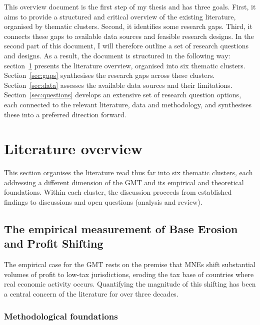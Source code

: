 \documentclass[11pt,a4paper]{article}
\begin{document}
This overview document is the first step of my thesis and has three goals. First, it aims to provide a structured and critical overview of the existing literature, organised by thematic clusters. Second, it identifies some research gaps. Third, it connects these gaps to available data sources and feasible research designs. In the second part of this document, I will therefore outline a set of research questions and designs. As a result, the document is structured in the following way: section~\ref{sec:literature} presents the literature overview, organised into six thematic clusters. Section~\ref{sec:gaps} synthesises the research gaps across these clusters. Section~\ref{sec:data} assesses the available data sources and their limitations. Section~\ref{sec:questions} develops an extensive set of research question options, each connected to the relevant literature, data and methodology, and synthesises these into a preferred direction forward.

\newpage

\section{Literature overview}\label{sec:literature}

This section organises the literature read thus far into six thematic clusters, each addressing a different dimension of the GMT and its empirical and theoretical foundations. Within each cluster, the discussion proceeds from established findings to discussions and open questions (analysis and review). 

\subsection{The empirical measurement of Base Erosion and Profit Shifting}\label{sec:beps}

The empirical case for the GMT rests on the premise that MNEs shift substantial volumes of profit to low-tax jurisdictions, eroding the tax base of countries where real economic activity occurs. Quantifying the magnitude of this shifting has been a central concern of the literature for over three decades.

\subsubsection{Methodological foundations}
\end{document}
